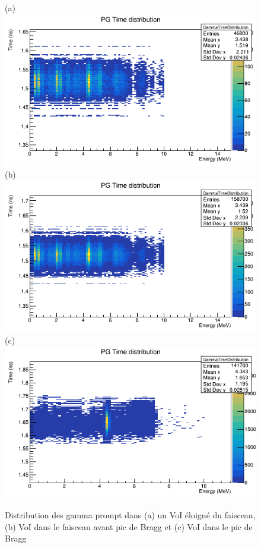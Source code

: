 \documentclass[11pt,a4paper,oldfontcommands]{memoir}
\begin{document}
\begin{figure}[h!]
\centering
\subfloat(a){\includegraphics[scale=0.3]{homo/PG/away.png}}
\subfloat(b){\includegraphics[scale=0.3]{homo/PG/preBragg.png}}\\
\subfloat(c){\includegraphics[scale=0.3]{homo/PG/postBragg.png}}
\label{homo pg}
\caption{ Distribution des gamma prompt dans (a) un VoI éloigné du faisceau, (b) VoI dans le faisceau avant pic de Bragg et (c) VoI dans le pic de Bragg }

\end{figure}{}
\end{document}
